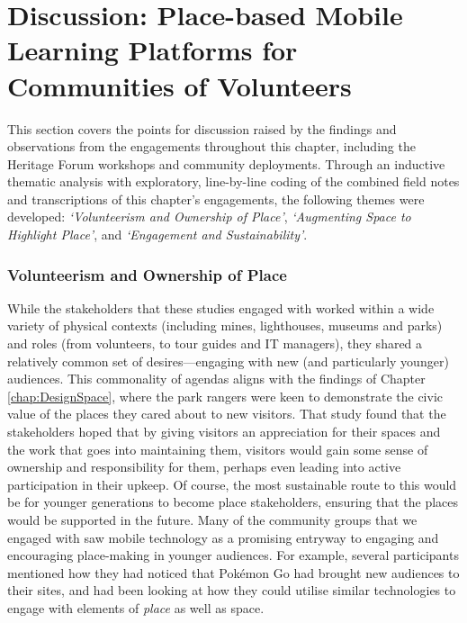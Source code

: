 \section{Discussion: Place-based Mobile Learning Platforms for Communities of Volunteers}
\label{sec:CommunityDiscussion}

This section covers the points for discussion raised by the findings and observations from the engagements throughout this chapter, including the Heritage Forum workshops and community deployments. Through an inductive thematic analysis with exploratory, line-by-line coding of the combined field notes and transcriptions of this chapter's engagements, the following themes were developed: \textit{`Volunteerism and Ownership of Place'}, \textit{`Augmenting Space to Highlight Place'}, and \textit{`Engagement and Sustainability'}.

\subsubsection{Volunteerism and Ownership of Place}

While the stakeholders that these studies engaged with worked within a wide variety of physical contexts (including mines, lighthouses, museums and parks) and roles (from volunteers, to tour guides and IT managers), they shared a relatively common set of desires---engaging with new (and particularly younger) audiences. This commonality of agendas aligns with the findings of Chapter \ref{chap:DesignSpace}, where the park rangers were keen to demonstrate the civic value of the places they cared about to new visitors. That study found that the stakeholders hoped that by giving visitors an appreciation for their spaces and the work that goes into maintaining them, visitors would gain some sense of ownership and responsibility for them, perhaps even leading into active participation in their upkeep. Of course, the most sustainable route to this would be for younger generations to become place stakeholders, ensuring that the places would be supported in the future. Many of the community groups that we engaged with saw mobile technology as a promising entryway to engaging and encouraging place-making in younger audiences. For example, several participants mentioned how they had noticed that Pok\'emon Go had brought new audiences to their sites, and had been looking at how they could utilise similar technologies to engage with elements of \textit{place} as well as space.

